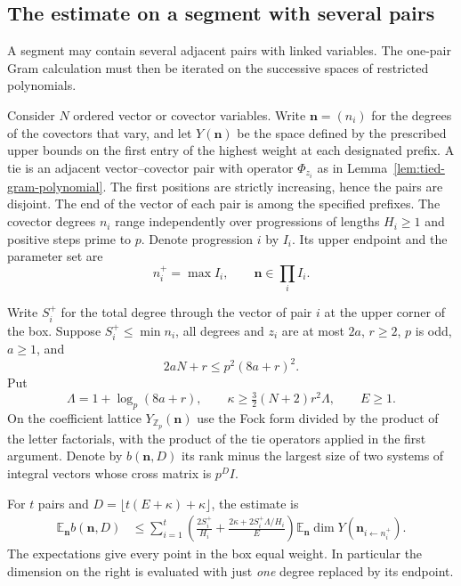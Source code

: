 \subsection{The estimate on a segment with several pairs}
\hypertarget{source-tied-segments}{}

A segment may contain several adjacent pairs with linked variables. The one-pair Gram calculation must then be iterated on the successive spaces of restricted polynomials.

Consider \(N\) ordered vector or covector variables. Write \(\mathbf n=(n_i)\) for the degrees of the covectors that vary, and let \(Y(\mathbf n)\) be the space defined by the prescribed upper bounds on the first entry of the highest weight at each designated prefix. A tie is an adjacent vector--covector pair with operator \(\Phi_{z_i}\) as in Lemma~\ref{lem:tied-gram-polynomial}. The first positions
are strictly increasing, hence the pairs are disjoint. The end
of the vector of each pair is among the specified prefixes.
The covector degrees \(n_i\) range independently over progressions
of lengths \(H_i\ge1\) and positive steps prime to \(p\).
Denote progression \(i\) by \(I_i\). Its upper endpoint and the parameter set are
\[
 n_i^+=\max I_i,\qquad \mathbf n\in\prod_i I_i.
\]

Write \(S_i^+\) for the total degree through the vector of pair
\(i\) at the upper corner of the box. Suppose \(S_i^+\le\min n_i\),
all degrees and \(z_i\) are at most \(2a\), \(r\ge2\), \(p\) is odd,
\(a\ge1\), and
\[
 2aN+r\le p^2(8a+r)^2.
\]
Put
\[
 \Lambda=1+\log_p(8a+r),\qquad
 \kappa\ge\tfrac32(N+2)r^2\Lambda,\qquad E\ge1 .
\]
On the coefficient lattice \(Y_{\mathbb Z_p}(\mathbf n)\) use the
Fock form divided by the product of the letter factorials, with the
product of the tie operators applied in the first argument.
Denote by \(b(\mathbf n,D)\) its rank minus the largest size of
two systems of integral vectors whose cross matrix is \(p^D I\).
\begin{proposition}
\label{prop:mean-tied-rank}
For \(t\) pairs and \(D=\lfloor t(E+\kappa)+\kappa\rfloor\),
the estimate is
\begin{align}
 \mathbb E_{\mathbf n} b(\mathbf n,D)
 &\le\sum_{i=1}^t\left(\frac{2S_i^+}{H_i}
            +\frac{2\kappa+2S_i^+\Lambda/H_i}{E}\right)
          \mathbb E_{\mathbf n}
              \dim Y(\mathbf n_{i\leftarrow n_i^+}).\label{eq:ties}
\end{align}
The expectations give every point in the box equal weight.
In particular the dimension on the right is evaluated with just
\emph{one} degree replaced by its endpoint.

\end{proposition}

